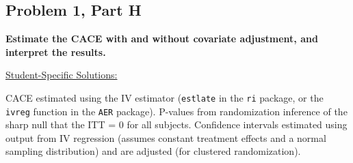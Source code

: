 \documentclass[11pt,notitlepage]{article}
\begin{document}
\clearpage


\subsection{Problem 1, Part H} {\bf Estimate the CACE with and without covariate adjustment, and interpret the results.}

\vspace{1cm}


\underline{{\sc Student-Specific Solutions:}}

CACE estimated using the IV estimator ({\tt estlate} in the {\tt ri} package, or the {\tt ivreg} function in the {\tt AER} package). P-values from randomization inference of the sharp null that the ITT = 0 for all subjects. Confidence intervals estimated using output from IV regression (assumes constant treatment effects and a normal sampling distribution) and are adjusted (for clustered randomization).
\end{document}
